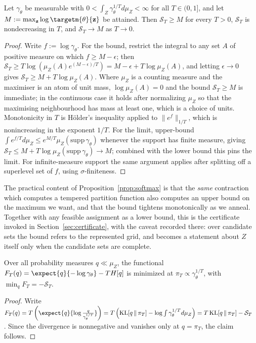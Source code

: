 \begin{proposition}
\label{prop:softmax}
Let $\gamma_\theta$ be measurable with $0 < \int_Z \gamma_\theta^{1/T} d\mu_Z < \infty$ for all $T \in (0, 1]$, and let $M := \max_{\mathbf{z}} \log \targetm{\theta}{\mathbf{z}}$ be attained. Then $\mathcal{S}_T \geq M$ for every $T > 0$, $\mathcal{S}_T$ is nondecreasing in $T$, and $\mathcal{S}_T \rightarrow M$ as $T \rightarrow 0$.
\end{proposition}
\begin{proof}
Write $f := \log \gamma_\theta$. For the bound, restrict the integral to any set $A$ of positive measure on which $f \geq M - \epsilon$; then $\mathcal{S}_T \geq T \log \left( \mu_Z(A) e^{(M-\epsilon)/T} \right) = M - \epsilon + T \log \mu_Z(A)$, and letting $\epsilon \rightarrow 0$ gives $\mathcal{S}_T \geq M + T \log \mu_Z(A)$. Where $\mu_Z$ is a counting measure and the maximiser is an atom of unit mass, $\log \mu_Z(A) = 0$ and the bound $\mathcal{S}_T \geq M$ is immediate; in the continuous case it holds after normalizing $\mu_Z$ so that the maximising neighbourhood has mass at least one, which is a choice of units. Monotonicity in $T$ is H\"{o}lder's inequality applied to $\lVert e^{f} \rVert_{1/T}$, which is nonincreasing in the exponent $1/T$. For the limit, upper-bound $\int e^{f/T} d\mu_Z \leq e^{M/T} \mu_Z(\mathrm{supp}\, \gamma_\theta)$ whenever the support has finite measure, giving $\mathcal{S}_T \leq M + T \log \mu_Z(\mathrm{supp}\, \gamma_\theta) \rightarrow M$; combined with the lower bound this pins the limit. For infinite-measure support the same argument applies after splitting off a superlevel set of $f$, using $\sigma$-finiteness.
\end{proof}

The practical content of Proposition~\ref{prop:softmax} is that the \emph{same} contraction which computes a tempered partition function also computes an upper bound on the maximum we want, and that the bound tightens monotonically as we anneal. Together with any feasible assignment as a lower bound, this is the certificate invoked in Section~\ref{sec:certificate}, with the caveat recorded there: over candidate sets the bound refers to the represented grid, and becomes a statement about $Z$ itself only when the candidate sets are complete.

\begin{proposition}
\label{prop:free_energy}
Over all probability measures $q \ll \mu_Z$, the functional $F_T(q) = \expect{q}{-\log \gamma_\theta} - T H[q]$ is minimized at $\pi_T \propto \gamma_\theta^{1/T}$, with $\min_q F_T = -\mathcal{S}_T$.
\end{proposition}
\begin{proof}
Write $F_T(q) = T \left( \expect{q}{\log \frac{q}{\gamma_\theta^{1/T}}} \right) = T \left( \mathrm{KL}\!\left[q \,\|\, \pi_T\right] - \log \int \gamma_\theta^{1/T} d\mu_Z \right) = T \, \mathrm{KL}\!\left[q \,\|\, \pi_T\right] - \mathcal{S}_T$. Since the divergence is nonnegative and vanishes only at $q = \pi_T$, the claim follows.
\end{proof}

